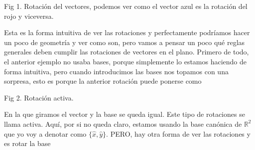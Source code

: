 \documentclass[12pt]{article}
\begin{document}
\begin{center}
\end{center}
\begin{center}
    Fig 1. Rotación del vectores, podemos ver como el vector azul es la rotación del rojo y viceversa. 
\end{center}
Esta es la forma intuitiva de ver las rotaciones y perfectamente podríamos hacer un poco de geometría y ver como son, pero vamos a pensar un poco qué reglas generales deben cumplir las rotaciones de vectores en el plano. Primero de todo, el anterior ejemplo no usaba bases, porque simplemente lo estamos haciendo de forma intuitiva, pero cuando introducimos las bases nos topamos con una sorpresa, esto es porque la anterior rotación puede ponerse como 
\begin{center}
\end{center}
\begin{center}
    Fig 2. Rotación activa. 
\end{center}
En la que giramos el vector y la base se queda igual. Este tipo de rotaciones se llama activa. Aquí, por si no queda claro, estamos usando la base canónica de $\mathbb{R}^2$ que yo voy a denotar como $\{\hat x, \hat y\}$. PERO, hay otra forma de ver las rotaciones y es rotar la base\\\\

\begin{center}
\end{center}
\end{document}
